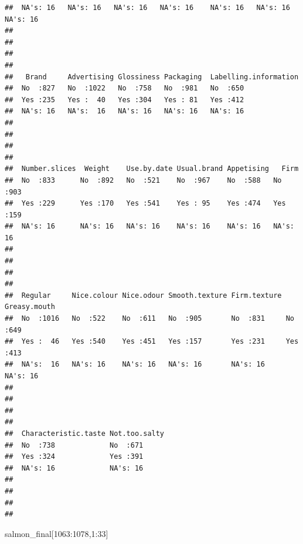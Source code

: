 \documentclass[
]{book}
\newenvironment{Shaded}{\begin{snugshade}}{\end{snugshade}}
\newcommand{\DecValTok}[1]{\textcolor[rgb]{0.00,0.00,0.81}{#1}}
\newcommand{\NormalTok}[1]{#1}
\newcommand{\SpecialCharTok}[1]{\textcolor[rgb]{0.00,0.00,0.00}{#1}}
\begin{document}
\begin{verbatim}
##  NA's: 16   NA's: 16   NA's: 16   NA's: 16    NA's: 16   NA's: 16   NA's: 16  
##                                                                               
##                                                                               
##                                                                               
##                                                                               
##   Brand     Advertising Glossiness Packaging  Labelling.information
##  No  :827   No  :1022   No  :758   No  :981   No  :650             
##  Yes :235   Yes :  40   Yes :304   Yes : 81   Yes :412             
##  NA's: 16   NA's:  16   NA's: 16   NA's: 16   NA's: 16             
##                                                                    
##                                                                    
##                                                                    
##                                                                    
##  Number.slices  Weight    Use.by.date Usual.brand Appetising   Firm    
##  No  :833      No  :892   No  :521    No  :967    No  :588   No  :903  
##  Yes :229      Yes :170   Yes :541    Yes : 95    Yes :474   Yes :159  
##  NA's: 16      NA's: 16   NA's: 16    NA's: 16    NA's: 16   NA's: 16  
##                                                                        
##                                                                        
##                                                                        
##                                                                        
##  Regular     Nice.colour Nice.odour Smooth.texture Firm.texture Greasy.mouth
##  No  :1016   No  :522    No  :611   No  :905       No  :831     No  :649    
##  Yes :  46   Yes :540    Yes :451   Yes :157       Yes :231     Yes :413    
##  NA's:  16   NA's: 16    NA's: 16   NA's: 16       NA's: 16     NA's: 16    
##                                                                             
##                                                                             
##                                                                             
##                                                                             
##  Characteristic.taste Not.too.salty
##  No  :738             No  :671     
##  Yes :324             Yes :391     
##  NA's: 16             NA's: 16     
##                                    
##                                    
##                                    
## 
\end{verbatim}

\begin{Shaded}
\begin{Highlighting}[]
\NormalTok{salmon\_final[}\DecValTok{1063}\SpecialCharTok{:}\DecValTok{1078}\NormalTok{,}\DecValTok{1}\SpecialCharTok{:}\DecValTok{33}\NormalTok{]}
\end{Highlighting}
\end{Shaded}
\end{document}
